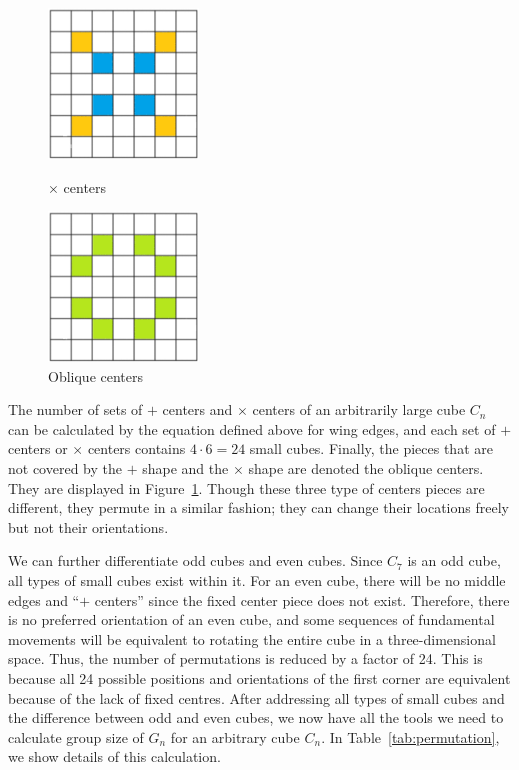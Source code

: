 \begin{figure}[ht]
    \centering
    \begin{minipage}{0.45\textwidth}
        \centering
        \includegraphics[width=4cm]{figures/structure/7_grid_x_center.png}
        \caption{$\times$ centers}\label{fig:7-x-center}
    \end{minipage}
    \begin{minipage}{0.45\textwidth}
        \centering
        \includegraphics[width=4cm]{figures/structure/7_grid_oblique_center.png}
        \caption{Oblique centers}\label{fig:7-oblique-center}
    \end{minipage}
\end{figure}
The number of sets of $+$ centers and $\times$ centers of an arbitrarily large cube $C_n$ can be calculated by the equation defined above for wing edges, and each set of $+$ centers or $\times$ centers contains $4 \cdot 6 = 24$ small cubes. Finally, the pieces that are not covered by the $+$ shape and the $\times$ shape are denoted the oblique centers. They are displayed in Figure~\ref{fig:7-oblique-center}. Though these three type of centers pieces are different, they permute in a similar fashion; they can change their locations freely but not their orientations.
\par We can further differentiate odd cubes and even cubes. Since $C_7$ is an odd cube, all types of small cubes exist within it. For an even cube, there will be no middle edges and ``$+$ centers'' since the fixed center piece does not exist. Therefore, there is no preferred orientation of an even cube, and some sequences of fundamental movements will be equivalent to rotating the entire cube in a three-dimensional space. Thus, the number of permutations is reduced by a factor of 24. This is because all 24 possible positions and orientations of the first corner are equivalent because of the lack of fixed centres. After addressing all types of small cubes and the difference between odd and even cubes, we now have all the tools we need to calculate group size of $G_n$ for an arbitrary cube $C_n$. In Table~\ref{tab:permutation}, we show details of this calculation. 

